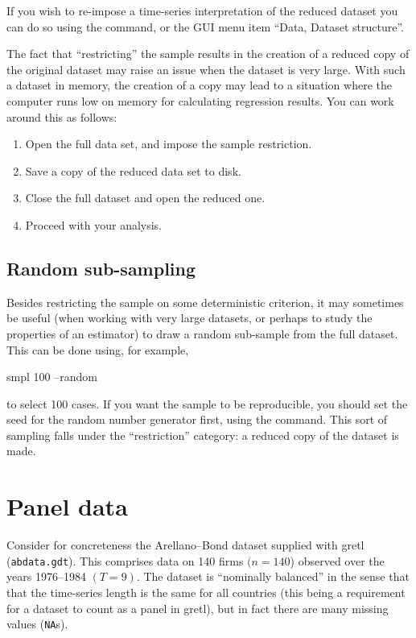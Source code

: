 If you wish to re-impose a time-series interpretation of the reduced
dataset you can do so using the  command, or the GUI menu
item ``Data, Dataset structure''.

The fact that ``restricting'' the sample results in the creation of a
reduced copy of the original dataset may raise an issue when the
dataset is very large.  With such a dataset in memory, the creation of
a copy may lead to a situation where the computer runs low on memory
for calculating regression results.  You can work around this as
follows:

\begin{enumerate}
\item Open the full data set, and impose the sample restriction.
\item Save a copy of the reduced data set to disk.
\item Close the full dataset and open the reduced one.
\item Proceed with your analysis.
\end{enumerate}

\subsection{Random sub-sampling}
\label{sample-random}

Besides restricting the sample on some deterministic criterion, it may
sometimes be useful (when working with very large datasets, or perhaps
to study the properties of an estimator) to draw a random sub-sample
from the full dataset.  This can be done using, for example,
%
\begin{code}
smpl 100 --random
\end{code}
%
to select 100 cases.  If you want the sample to be reproducible, you
should set the seed for the random number generator first, using the
 command.  This sort of sampling falls under the
``restriction'' category: a reduced copy of the dataset is made.

\section{Panel data}
\label{sec:smpl-panel}

Consider for concreteness the Arellano--Bond dataset supplied with
gretl (\texttt{abdata.gdt}). This comprises data on 140 firms
$(n=140$) observed over the years 1976--1984 $(T=9)$. The dataset is
``nominally balanced'' in the sense that that the time-series length
is the same for all countries (this being a requirement for a dataset
to count as a panel in gretl), but in fact there are many missing
values (\texttt{NA}s).

